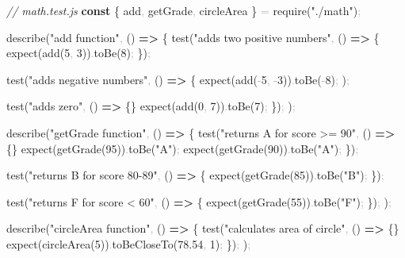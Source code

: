 \documentclass[
  justified,
  openright,
]{tufte-book}
\newcommand{\KeywordTok}[1]{\textcolor{CodeKeyword}{\textbf{#1}}}  %
\newcommand{\StringTok}[1]{\textcolor{CodeString}{#1}}              %
\newcommand{\CommentTok}[1]{\textcolor{CodeComment}{\textit{#1}}}  %
\newcommand{\CodeNumTok}[1]{\textcolor{CodeNumber}{#1}}             %
\newcommand{\CodeFuncTok}[1]{\textcolor{CodeKeyword}{#1}}           %
\newcommand{\CodeAccentTok}[1]{\textcolor{CodeAccent}{#1}}          %
\newcommand{\OperatorTok}[1]{\textcolor{DarkGray}{#1}}              %
\newenvironment{Shaded}{%
  \begin{mdframed}[style=TufteCode]%
}{%
  \end{mdframed}%
}
\begin{document}
\begin{Shaded}
\begin{Highlighting}[]
\CommentTok{// math.test.js}
\KeywordTok{const} \{ add\OperatorTok{,} getGrade\OperatorTok{,} circleArea \} \OperatorTok{=} \CodeAccentTok{require}(\StringTok{"./math"})\OperatorTok{;}
 
\CodeFuncTok{describe}(\StringTok{"add function"}\OperatorTok{,} () \KeywordTok{=\textgreater{}} \{
  \CodeFuncTok{test}(\StringTok{"adds two positive numbers"}\OperatorTok{,} () \KeywordTok{=\textgreater{}} \{
    \CodeFuncTok{expect}(\CodeFuncTok{add}(\CodeNumTok{5}\OperatorTok{,} \CodeNumTok{3}))\OperatorTok{.}\CodeFuncTok{toBe}(\CodeNumTok{8})\OperatorTok{;}
  \})\OperatorTok{;}
 
  \CodeFuncTok{test}(\StringTok{"adds negative numbers"}\OperatorTok{,} () \KeywordTok{=\textgreater{}} \{
    \CodeFuncTok{expect}(\CodeFuncTok{add}(\OperatorTok{{-}}\CodeNumTok{5}\OperatorTok{,} \OperatorTok{{-}}\CodeNumTok{3}))\OperatorTok{.}\CodeFuncTok{toBe}(\OperatorTok{{-}}\CodeNumTok{8})\OperatorTok{;}
  )\OperatorTok{;}
 
  \CodeFuncTok{test}(\StringTok{"adds zero"}\OperatorTok{,} () \KeywordTok{=\textgreater{}} \{\}
    \CodeFuncTok{expect}(\CodeFuncTok{add}(\CodeNumTok{0}\OperatorTok{,} \CodeNumTok{7}))\OperatorTok{.}\CodeFuncTok{toBe}(\CodeNumTok{7})\OperatorTok{;}
  \})\OperatorTok{;}
)\OperatorTok{;}
 
\CodeFuncTok{describe}(\StringTok{"getGrade function"}\OperatorTok{,} () \KeywordTok{=\textgreater{}} \{
  \CodeFuncTok{test}(\StringTok{"returns A for score \textgreater{}= 90"}\OperatorTok{,} () \KeywordTok{=\textgreater{}} \{\}
    \CodeFuncTok{expect}(\CodeFuncTok{getGrade}(\CodeNumTok{95}))\OperatorTok{.}\CodeFuncTok{toBe}(\StringTok{"A"})\OperatorTok{;}
    \CodeFuncTok{expect}(\CodeFuncTok{getGrade}(\CodeNumTok{90}))\OperatorTok{.}\CodeFuncTok{toBe}(\StringTok{"A"})\OperatorTok{;}
  \})\OperatorTok{;}
 
  \CodeFuncTok{test}(\StringTok{"returns B for score 80{-}89"}\OperatorTok{,} () \KeywordTok{=\textgreater{}} \{
    \CodeFuncTok{expect}(\CodeFuncTok{getGrade}(\CodeNumTok{85}))\OperatorTok{.}\CodeFuncTok{toBe}(\StringTok{"B"})\OperatorTok{;}
  \})\OperatorTok{;}
 
  \CodeFuncTok{test}(\StringTok{"returns F for score \textless{} 60"}\OperatorTok{,} () \KeywordTok{=\textgreater{}} \{
    \CodeFuncTok{expect}(\CodeFuncTok{getGrade}(\CodeNumTok{55}))\OperatorTok{.}\CodeFuncTok{toBe}(\StringTok{"F"})\OperatorTok{;}
  \})\OperatorTok{;}
)\OperatorTok{;}
 
\CodeFuncTok{describe}(\StringTok{"circleArea function"}\OperatorTok{,} () \KeywordTok{=\textgreater{}} \{
  \CodeFuncTok{test}(\StringTok{"calculates area of circle"}\OperatorTok{,} () \KeywordTok{=\textgreater{}} \{\}
    \CodeFuncTok{expect}(\CodeFuncTok{circleArea}(\CodeNumTok{5}))\OperatorTok{.}\CodeFuncTok{toBeCloseTo}(\CodeNumTok{78.54}\OperatorTok{,} \CodeNumTok{1})\OperatorTok{;}
  \})\OperatorTok{;}
)\OperatorTok{;}
\end{Highlighting}
\end{Shaded}
\end{document}
